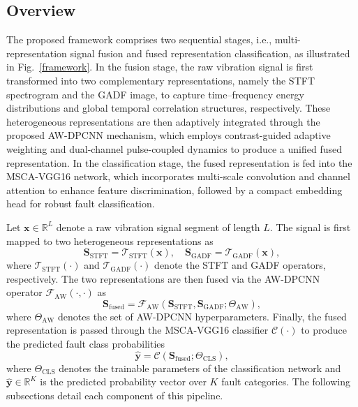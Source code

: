 \documentclass[pdflatex,sn-mathphys-num]{sn-jnl}
\theoremstyle{thmstyleone}%
\theoremstyle{thmstyletwo}%
\theoremstyle{thmstylethree}%
\begin{document}
\subsection{Overview}

The proposed framework comprises two sequential stages, i.e., multi-representation signal fusion and fused representation classification, as illustrated in Fig.~\ref{framework}. In the fusion stage, the raw vibration signal is first transformed into two complementary representations, namely the STFT spectrogram and the GADF image, to capture time--frequency energy distributions and global temporal correlation structures, respectively. These heterogeneous representations are then adaptively integrated through the proposed AW-DPCNN mechanism, which employs contrast-guided adaptive weighting and dual-channel pulse-coupled dynamics to produce a unified fused representation. In the classification stage, the fused representation is fed into the MSCA-VGG16 network, which incorporates multi-scale convolution and channel attention to enhance feature discrimination, followed by a compact embedding head for robust fault classification.

Let $\boldsymbol{x} \in \mathbb{R}^{L}$ denote a raw vibration signal segment of length $L$. The signal is first mapped to two heterogeneous representations as
\begin{equation}
\boldsymbol{S}_{\mathrm{STFT}} = \mathcal{T}_{\mathrm{STFT}}(\boldsymbol{x}), \quad
\boldsymbol{S}_{\mathrm{GADF}} = \mathcal{T}_{\mathrm{GADF}}(\boldsymbol{x}),
\label{eq:pipeline_rep}
\end{equation}
where $\mathcal{T}_{\mathrm{STFT}}(\cdot)$ and $\mathcal{T}_{\mathrm{GADF}}(\cdot)$ denote the STFT and GADF operators, respectively. The two representations are then fused via the AW-DPCNN operator $\mathcal{F}_{\mathrm{AW}}(\cdot, \cdot)$ as
\begin{equation}
\boldsymbol{S}_{\mathrm{fused}} = \mathcal{F}_{\mathrm{AW}}(\boldsymbol{S}_{\mathrm{STFT}}, \boldsymbol{S}_{\mathrm{GADF}}; \Theta_{\mathrm{AW}}),
\label{eq:pipeline_fuse}
\end{equation}
where $\Theta_{\mathrm{AW}}$ denotes the set of AW-DPCNN hyperparameters. Finally, the fused representation is passed through the MSCA-VGG16 classifier $\mathcal{C}(\cdot)$ to produce the predicted fault class probabilities
\begin{equation}
\hat{\boldsymbol{y}} = \mathcal{C}(\boldsymbol{S}_{\mathrm{fused}}; \Theta_{\mathrm{CLS}}),
\label{eq:pipeline_cls}
\end{equation}
where $\Theta_{\mathrm{CLS}}$ denotes the trainable parameters of the classification network and $\hat{\boldsymbol{y}} \in \mathbb{R}^{K}$ is the predicted probability vector over $K$ fault categories. The following subsections detail each component of this pipeline.
\end{document}
